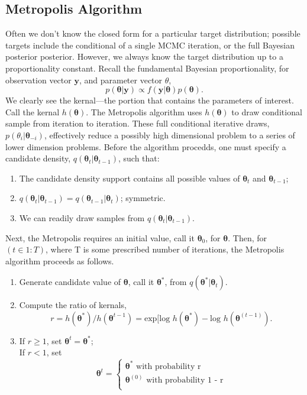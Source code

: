 \subsection{Metropolis Algorithm} 
\citep{Banerjee2014}
Often we don't know the closed form for a particular target distribution; possible targets include the conditional of a single MCMC iteration, or the full Bayesian posterior posterior. However, we always know the target distribution up to a proportionality constant. Recall the fundamental Bayesian proportionality, for observation vector $\pmb{y}$, and parameter vector $\theta$,
$$p(\pmb{\theta}|\pmb{y}) \propto f(\pmb{y}|\pmb{\theta})p(\pmb{\theta}).$$
We clearly see the kernal---the portion that contains the parameters of interest. Call the kernal $h(\pmb{\theta})$. The Metropolis algorithm uses $h(\pmb{\theta})$ to draw conditional sample from  iteration to iteration. These full conditional iterative draws, $p(\theta_{i}|\pmb{\theta}_{-i})$, effectively reduce a possibly high dimensional problem to a series of lower dimension problems. Before the algorithm procedds, one must specify a candidate density, $q(\pmb{\theta}_{t}|\pmb{\theta}_{t-1})$, such that:
  \begin{enumerate}
  \item The candidate density support contains all possible values of $\pmb{\theta}_{t}$ and $\pmb{\theta}_{t-1}$; 
  \item $q(\pmb{\theta}_{t}|\pmb{\theta}_{t-1}) = q(\pmb{\theta}_{t-1}|\pmb{\theta}_{t})$; symmetric.
  \item We can readily draw samples from $q(\pmb{\theta}_{t}|\pmb{\theta}_{t-1})$.
  \end{enumerate}
Next, the Metropolis requires an initial value, call it $\pmb{\theta}_{0}$, for $\pmb{\theta}$. Then, for $(t \in 1:T)$, where T is some prescribed number of iterations, the Metropolis algorithm proceeds as follows.
\begin{enumerate}
\item Generate candidate value of $\pmb{\theta}$, call it $\pmb{\theta}^{*}$, from $q(\pmb{\theta}^{*}|\pmb{\theta}_{t})$.
\item Compute the ratio of kernals,
$$ r=h(\pmb{\theta}^{*})/h(\pmb{\theta}^{t-1}) = \text{exp}[\text{log }h(\pmb{\theta}^{*}) - \text{log }h(\pmb{\theta}^{(t-1)}). $$
\item If $r \geq  1$, set $\pmb{\theta}^{t} = \pmb{\theta}^{*}$; \\
            If $r < 1$, set 
            \[ 
            \pmb{\theta}^{t} = 
            \begin{cases} 
            \pmb{\theta}^{*} \text{ with probability r} \\
            \pmb{\theta}^{(0)} \text{ with probability 1 - r} \\
            \end{cases}
            \]
  \end{enumerate}
  
